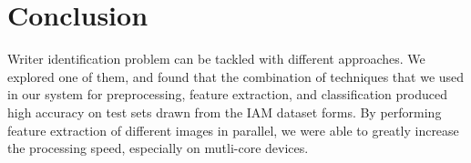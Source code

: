 \section{Conclusion}
Writer identification problem can be tackled with different approaches. We explored one of them, and found that the combination of techniques that we used in our system for preprocessing, feature extraction, and classification produced high accuracy on test sets drawn from the IAM dataset forms. By performing feature extraction of different images in parallel, we were able to greatly increase the processing speed, especially on mutli-core devices.